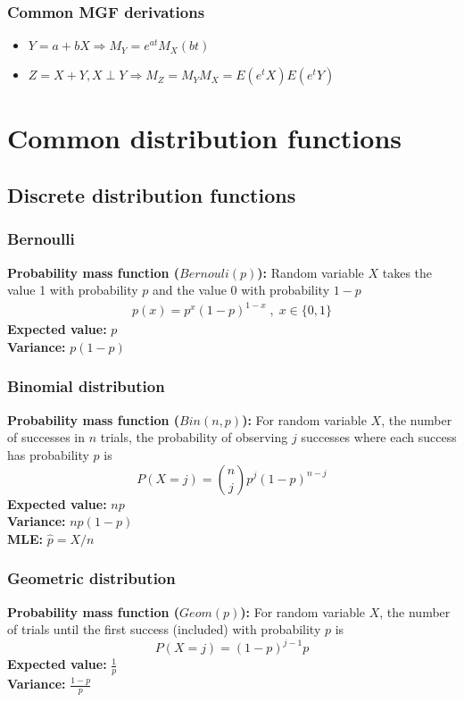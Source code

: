 \documentclass{article}
\begin{document}
\subsubsection{Common MGF derivations}
\begin{itemize}
    \item $Y = a+bX \Longrightarrow M_Y = e^{at}M_X(bt)$
    \item $Z = X+Y, X \perp Y \Longrightarrow M_Z = M_YM_X = E(e^tX)E(e^tY)$
\end{itemize}




\section{Common distribution functions}
\subsection{Discrete distribution functions}
\subsubsection{Bernoulli}
\textbf{Probability mass function ($Bernouli(p)$):} Random variable $X$ takes the value 1 with probability $p$ and the value 0 with probability $1-p$
\begin{align*}
    p(x) = p^x(1-p)^{1-x} \;,\; x \in \{0, 1\}
\end{align*}
\textbf{Expected value:} $p$\\
\textbf{Variance:} $p(1-p)$

\subsubsection{Binomial distribution}
\textbf{Probability mass function ($Bin(n,p)$):} For random variable $X$, the number of successes in $n$ trials, the probability of observing $j$ successes where each success has probability $p$ is
\begin{equation*}
    P(X = j) = {n \choose j} p^j (1 - p)^{n-j}
\end{equation*}
\textbf{Expected value:} $np$\\
\textbf{Variance:} $np(1-p)$\\
\textbf{MLE:} $\hat{p} = X/n$

\subsubsection{Geometric distribution}
\textbf{Probability mass function ($Geom(p)$):} For random variable $X$, the number of trials until the first success (included) with probability $p$ is
\begin{equation*}
    P(X=j) = (1-p)^{j-1}p
\end{equation*}
\textbf{Expected value:} $\frac{1}{p}$\\
\textbf{Variance:} $\frac{1-p}{p}$
\end{document}
